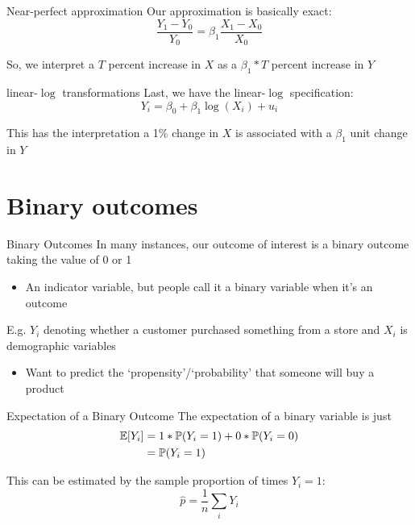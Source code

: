 \documentclass[aspectratio=169,t,11pt,table]{beamer}
\begin{document}

\begin{frame}{Near-perfect approximation}
  Our approximation is basically exact:
  $$
    \frac{Y_1 - Y_0}{Y_0} = \beta_1 \frac{X_1 - X_0}{X_0}
  $$

  \bigskip
  So, we interpret a $T$ percent increase in $X$ as a $\beta_1 * T$ percent increase in $Y$
\end{frame}
 

\begin{frame}{linear-$\log$ transformations}
  Last, we have the linear-$\log$ specification:
  $$
    Y_i = \beta_0 + \beta_1 \log(X_i) + u_i
  $$

  \bigskip
  This has the interpretation a 1\% change in $X$ is associated with a $\beta_1$ unit change in $Y$
\end{frame}



\section{Binary outcomes}

\begin{frame}{Binary Outcomes}
  In many instances, our outcome of interest is a \alert{binary outcome} taking the value of 0 or 1
  \begin{itemize}
    \item An indicator variable, but people call it a binary variable when it's an outcome
  \end{itemize}
  
  \bigskip
  E.g. $Y_i$ denoting whether a customer purchased something from a store and $X_i$ is demographic variables
  \begin{itemize}
    \item Want to predict the `propensity'/`probability' that someone will buy a product 
  \end{itemize}
\end{frame}

\begin{frame}{Expectation of a Binary Outcome}
  The expectation of a binary variable is just 
  \begin{align*}
    \expec{Y_i} &= 
    1 * \prob{Y_i = 1} + 0 * \prob{Y_i = 0} \\
    &= \prob{Y_i = 1}
  \end{align*}
  
  \bigskip
  This can be estimated by the sample proportion of times $Y_i = 1$:
  $$
    \hat{p} = \frac{1}{n} \sum_i Y_i
  $$
\end{frame}
\end{document}
